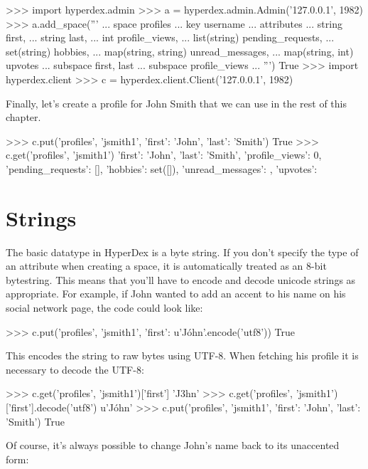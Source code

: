 \begin{pythoncode}
>>> import hyperdex.admin
>>> a = hyperdex.admin.Admin('127.0.0.1', 1982)
>>> a.add_space('''
... space profiles
... key username
... attributes
...    string first,
...    string last,
...    int profile_views,
...    list(string) pending_requests,
...    set(string) hobbies,
...    map(string, string) unread_messages,
...    map(string, int) upvotes
... subspace first, last
... subspace profile_views
... ''')
True
>>> import hyperdex.client
>>> c = hyperdex.client.Client('127.0.0.1', 1982)
\end{pythoncode}

Finally, let's create a profile for John Smith that we can use in the rest of
this chapter.

\begin{pythoncode}
>>> c.put('profiles', 'jsmith1', {'first': 'John', 'last': 'Smith'})
True
>>> c.get('profiles', 'jsmith1')
{'first': 'John', 'last': 'Smith',
 'profile_views': 0,
 'pending_requests': [],
 'hobbies': set([]),
 'unread_messages': {},
 'upvotes': {}}
\end{pythoncode}

\section{Strings}

The basic datatype in HyperDex is a byte string.  If you don't specify the type
of an attribute when creating a space, it is automatically treated as an 8-bit
bytestring.  This means that you'll have to encode and decode unicode strings as
appropriate.  For example, if John wanted to add an accent to his name on his
social network page, the code could look like:

\begin{pythoncode}
>>> c.put('profiles', 'jsmith1', {'first': u'Jóhn'.encode('utf8')})
True
\end{pythoncode}

This encodes the string to raw bytes using UTF-8.  When fetching his profile it
is necessary to decode the UTF-8:

\begin{pythoncode}
>>> c.get('profiles', 'jsmith1')['first']
'J\xb3hn'
>>> c.get('profiles', 'jsmith1')['first'].decode('utf8')
u'Jóhn'
>>> c.put('profiles', 'jsmith1', {'first': 'John', 'last': 'Smith'})
True
\end{pythoncode}

Of course, it's always possible to change John's name back to its unaccented
form:

